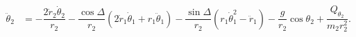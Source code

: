 \documentclass[12pt,a4paper,portrait]{article}
\begin{document}
\begin{landscape}
\begin{align*}
	\ddot{\theta}_2 &= -\dfrac{2\dot{r}_2\dot{\theta}_2}{r_2} - \dfrac{\cos{\Delta}}{r_2}(2\dot{r}_1\dot{\theta}_1+r_1\ddot{\theta}_1) - \dfrac{\sin{\Delta}}{r_2}(r_1\dot{\theta}_1^2 - \ddot{r}_1) - \dfrac{g}{r_2}\cos{\theta_2} + \dfrac{Q_{\theta_2}}{m_2r_2^2}.
\end{align*}
\end{landscape}
\end{document}
